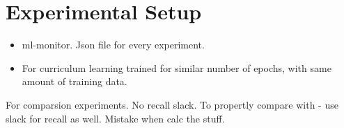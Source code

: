 \section{Experimental Setup}
\label{sec:experimentalSetup}
\begin{itemize}
\item ml-monitor. Json file for every experiment.
\item For curriculum learning trained for similar number of epochs, with same amount of training data.
\end{itemize}

For comparsion experiments. No recall slack.
To propertly compare with - use slack for recall as well. Mistake when calc the stuff.